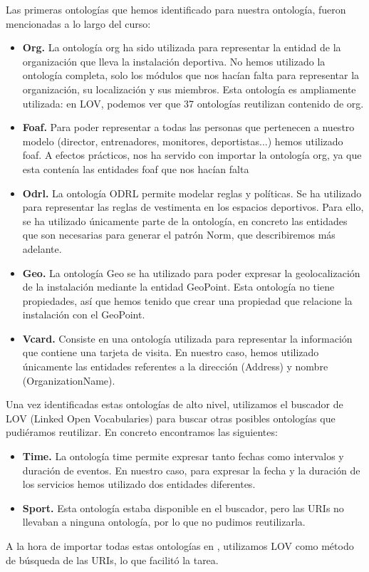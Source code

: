 \documentclass[a4paper,12pt]{article}
\begin{document}
	Las primeras ontologías que hemos identificado para nuestra ontología, fueron mencionadas a lo largo del curso:
	\begin{itemize}
		\item \textbf{Org.} La ontología org ha sido utilizada para representar la entidad de la organización que lleva la instalación deportiva. No hemos utilizado la ontología completa, solo los módulos que nos hacían falta para representar la organización, su localización y sus miembros. Esta ontología es ampliamente utilizada: en LOV, podemos ver que 37 ontologías reutilizan contenido de org.
		\item \textbf{Foaf.} Para poder representar a todas las personas que pertenecen a nuestro modelo (director, entrenadores, monitores, deportistas...) hemos utilizado foaf. A efectos prácticos, nos ha servido con importar la ontología org, ya que esta contenía las entidades foaf que nos hacían falta
		\item \textbf{Odrl.} La ontología ODRL permite modelar reglas y políticas. Se ha utilizado para representar las reglas de vestimenta en los espacios deportivos. Para ello, se ha utilizado únicamente parte de la ontología, en concreto las entidades que son necesarias para generar el patrón Norm, que describiremos más adelante.
		\item \textbf{Geo.} La ontología Geo se ha utilizado para poder expresar la geolocalización de la instalación mediante la entidad GeoPoint. Esta ontología no tiene propiedades, así que hemos tenido que crear una propiedad que relacione la instalación con el GeoPoint. 
		\item \textbf{Vcard.} Consiste en una ontología utilizada para representar la información que contiene una tarjeta de visita. En nuestro caso, hemos utilizado únicamente las entidades referentes a la dirección (Address) y nombre (OrganizationName).
		
	\end{itemize}
	Una vez identificadas estas ontologías de alto nivel, utilizamos el buscador de LOV (Linked Open Vocabularies) para buscar otras posibles ontologías que pudiéramos reutilizar. En concreto encontramos las siguientes:
	
	\begin{itemize}
		\item \textbf{Time.} La ontología time permite expresar tanto fechas como intervalos y duración de eventos. En nuestro caso, para expresar la fecha y la duración de los servicios hemos utilizado dos entidades diferentes.
		\item \textbf{Sport.} Esta ontología estaba disponible en el buscador, pero las URIs no llevaban a ninguna ontología, por lo que no pudimos reutilizarla. 
	\end{itemize}
	A la hora de importar todas estas ontologías en , utilizamos LOV como método de búsqueda de las URIs, lo que facilitó la tarea. 
	
\end{document}
